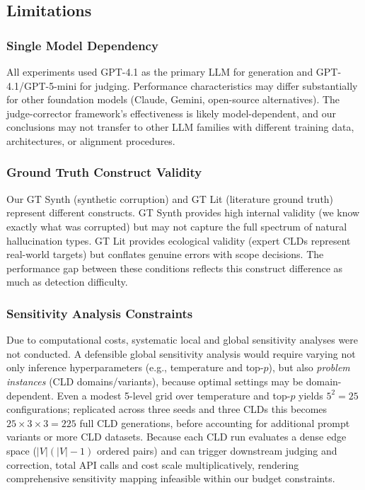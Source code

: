 \subsection{Limitations}
\label{sec:discussion_limitations}

\subsubsection{Single Model Dependency}

All experiments used GPT-4.1 as the primary LLM for generation and GPT-4.1/GPT-5-mini for judging. Performance characteristics may differ substantially for other foundation models (Claude, Gemini, open-source alternatives). The judge-corrector framework's effectiveness is likely model-dependent, and our conclusions may not transfer to other LLM families with different training data, architectures, or alignment procedures.

\subsubsection{Ground Truth Construct Validity}

Our GT Synth (synthetic corruption) and GT Lit (literature ground truth) represent different constructs. GT Synth provides high internal validity (we know exactly what was corrupted) but may not capture the full spectrum of natural hallucination types. GT Lit provides ecological validity (expert CLDs represent real-world targets) but conflates genuine errors with scope decisions. The performance gap between these conditions reflects this construct difference as much as detection difficulty.

\subsubsection{Sensitivity Analysis Constraints}

Due to computational costs, systematic local and global sensitivity analyses were not conducted. A defensible global sensitivity analysis would require varying not only inference hyperparameters (e.g., temperature and top-$p$), but also \textit{problem instances} (CLD domains/variants), because optimal settings may be domain-dependent. Even a modest 5-level grid over temperature and top-$p$ yields $5^2 = 25$ configurations; replicated across three seeds and three CLDs this becomes $25 \times 3 \times 3 = 225$ full CLD generations, before accounting for additional prompt variants or more CLD datasets. Because each CLD run evaluates a dense edge space ($|V|(|V|-1)$ ordered pairs) and can trigger downstream judging and correction, total API calls and cost scale multiplicatively, rendering comprehensive sensitivity mapping infeasible within our budget constraints.

